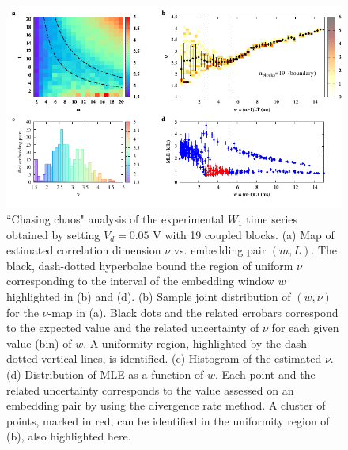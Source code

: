 \begin{figure}[H]
    \centering
    \includegraphics[width=\linewidth]{../blocks/19_blocks/edge/2e5_points/plots/chaos_low.pdf}
    \caption{``Chasing chaos" analysis of the experimental $W_1$ time series obtained by setting $V_d=0.05$ V with 19 coupled blocks.
    (a) Map of estimated correlation dimension $\nu$ vs. embedding pair $(m, L)$.
    The black, dash-dotted hyperbolae bound the region of uniform $\nu$ corresponding to the interval of the
    embedding window $w$ highlighted in (b) and (d).
    (b) Sample joint distribution of $(w,\nu)$ for the $\nu$-map in (a).
    Black dots and the related errobars correspond to the expected value and the related uncertainty of $\nu$
    for each given value (bin) of $w$. A uniformity region, highlighted by the dash-dotted vertical lines,
    is identified. (c) Histogram of the estimated $\nu$. (d) Distribution of MLE as a function of $w$. Each point and the related
    uncertainty corresponds to the value assessed on an embedding pair by using the divergence rate method.
    A cluster of points, marked in red, can be identified in the uniformity region of (b), also highlighted here.}
    \label{fig:19 blocks chaos}
\end{figure}

